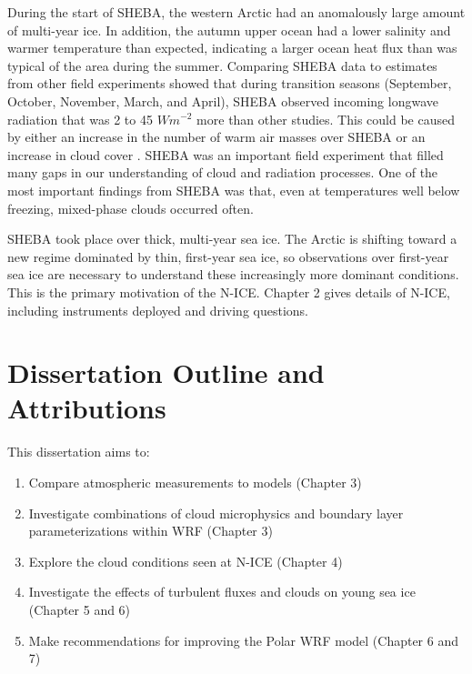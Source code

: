 During the start of SHEBA, the western Arctic had an anomalously large amount of multi-year ice. In addition, the autumn upper ocean had a lower salinity and warmer temperature than expected, indicating a larger ocean heat flux than was typical of the area during the summer. Comparing SHEBA data to estimates from other field experiments showed that during transition seasons (September, October, November, March, and April), SHEBA observed incoming longwave radiation that was 2 to 45 $Wm^{-2}$ more than other studies. This could be caused by either an increase in the number of warm air masses over SHEBA or an increase in cloud cover \citep{persson:2002}. SHEBA was an important field experiment that filled many gaps in our understanding of cloud and radiation processes. One of the most important findings from SHEBA was that, even at temperatures well below freezing, mixed-phase clouds occurred often. 

SHEBA took place over thick, multi-year sea ice. The Arctic is shifting toward a new regime dominated by thin, first-year sea ice, so observations over first-year sea ice are necessary to understand these increasingly more dominant conditions. This is the primary motivation of the N-ICE. Chapter 2 gives details of N-ICE, including instruments deployed and driving questions.

\section{Dissertation Outline and Attributions}
\newline 
\noindent This dissertation aims to:
\begin{enumerate}
\item Compare atmospheric measurements to models (Chapter 3)
\item Investigate combinations of cloud microphysics and boundary layer parameterizations within WRF (Chapter 3)
\item Explore the cloud conditions seen at N-ICE (Chapter 4)
\item Investigate the effects of turbulent fluxes and clouds on young sea ice (Chapter 5 and 6)
\item Make recommendations for improving the Polar WRF model (Chapter 6 and 7)
\end{enumerate}

